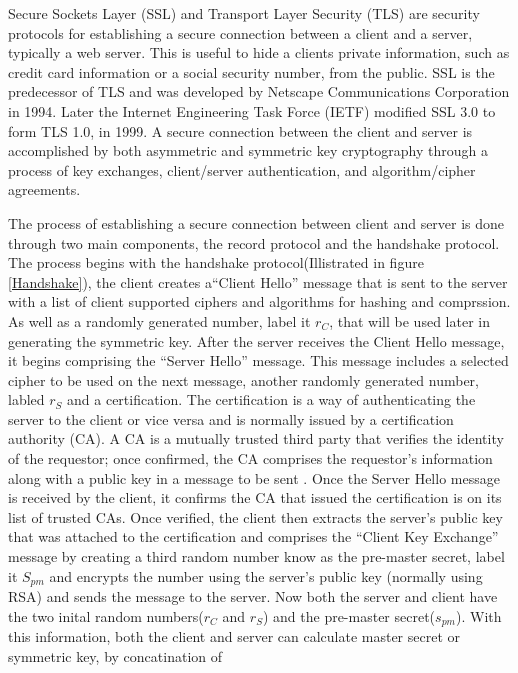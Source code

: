 Secure Sockets Layer (SSL) and Transport Layer Security (TLS) are security
protocols for establishing a secure connection between a client and a server,
typically a web server.  This is useful to hide a clients private information,
such as credit card information or a social security number, from the public.
SSL is the predecessor of TLS and was developed by Netscape Communications
Corporation in 1994.  Later the Internet Engineering Task Force (IETF)
modified SSL 3.0 to form TLS 1.0, in 1999.  A secure connection between the
client and server is accomplished by both asymmetric and symmetric key
cryptography through a process of key exchanges, client/server authentication,
and algorithm/cipher agreements.

The process of establishing a secure connection between client and server is
done through two main components, the record protocol and the handshake protocol.  The process begins with the handshake protocol(Illistrated in figure \ref{Handshake}), the client creates a``Client Hello'' message that is sent to the server with a list of client supported ciphers and algorithms for hashing and comprssion.  As well as a randomly generated number, label it $r_{C}$, that will be used later in generating the symmetric key.  After the server receives the Client Hello message, it begins
comprising the ``Server Hello'' message.  This message includes a selected cipher to be used on the next message, another randomly generated number, labled $r_{S}$ and a
certification.  The certification is a way of authenticating the server to the
client or vice versa and is normally issued by a certification authority (CA).
A CA is a mutually trusted third party that verifies the identity of the
requestor; once confirmed, the CA comprises the requestor's information along
with a public key in a message to be sent \cite[p. 105]{oppliger}.  Once the Server
Hello message is received by the client, it confirms the CA that issued the
certification is on its list of trusted CAs.  Once verified, the client then
extracts the server's public key that was attached to the certification and comprises the
``Client Key Exchange'' message by creating a third random number know as the pre-master secret, label it $S_{pm}$  and encrypts
the number using the server's public key (normally using RSA) and sends the
message to the server.  Now both the server and client have the two inital random numbers($r_{C}$ and $r_{S}$) and the pre-master secret($s_{pm}$).  With this information, both the client and server can calculate master secret or symmetric key, by concatination of 

